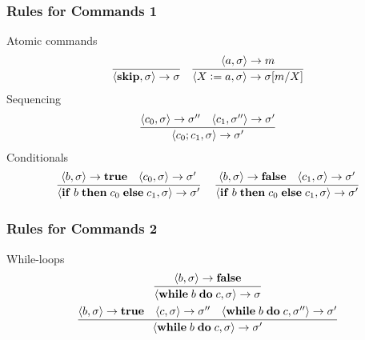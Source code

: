 \documentclass[12pt,aspectratio=169]{beamer}
\def\coloneqq{\mathrel{\mathop:}=}%
\newcommand{\cpair}[1]{\langle #1 \rangle}
\newcommand{\ifthen}[3]{\mathbf{if}\; #1 \; \mathbf{then}\; #2 \; \mathbf{else}\; #3}
\newcommand{\while}[2]{\mathbf{while}\; #1 \; \mathbf{do}\; #2}
\begin{document}
\begin{frame}
    \frametitle{Rules for Commands 1}

    \begin{definition}
        Atomic commands
        \begin{align*}
            \infer{\langle \mathbf{skip} , \sigma\rangle \rightarrow \sigma}{} 
            \;\;\;\; 
            \infer{\cpair{X \coloneqq a, \sigma} \to \sigma[m/X]}{\cpair{a, \sigma} \to m}
        \end{align*}
        Sequencing
            \begin{align*}
            \infer{\langle c_0;c_1, \sigma \rangle \rightarrow \sigma'}{\langle c_0, \sigma \rangle \to \sigma'' & \langle c_1, \sigma'' \rangle \to \sigma'}
        \end{align*}
        Conditionals
        \begin{align*}\infer{\langle \ifthen{b}{c_0}{c_1}, \sigma \rangle \to \sigma'}
            {\cpair{b,\sigma} \to \mathbf{true} & \cpair{c_0, \sigma} \to \sigma'}
            \;\;\;\;\; \infer{\cpair{\ifthen{b}{c_0}{c_1}, \sigma} \to \sigma'}
                {\cpair{b,\sigma} \to \mathbf{false} & \cpair{c_1, \sigma} \to \sigma'}
        \end{align*}
    \end{definition}
\end{frame}

\begin{frame}
    \frametitle{Rules for Commands 2}
    \begin{definition}
        While-loops
        \begin{gather*}
                \infer{\cpair{\while{b}{c}, \sigma} \to \sigma}{\cpair{b, \sigma} \to \mathbf{false}}\\
                \infer{\cpair{\while{b}{c}, \sigma} \to \sigma'}
                {\cpair{b,\sigma} \to \mathbf{true} & \cpair{c, \sigma} \to \sigma'' & \cpair{\while{b}{c},\sigma''} \to \sigma'}
        \end{gather*}
    \end{definition}


\end{frame}
\end{document}
